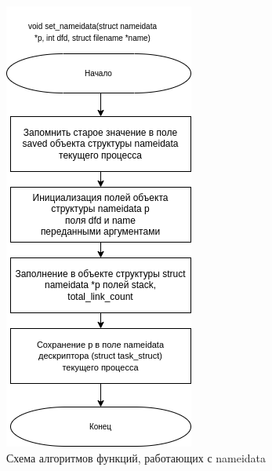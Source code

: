 \begin{figure}[H]
	\centering
	\includegraphics[scale=0.6]{assets/open-set_nameidata.drawio.png}
	\caption{Схема алгоритмов функций, работающих с nameidata}
\end{figure}

